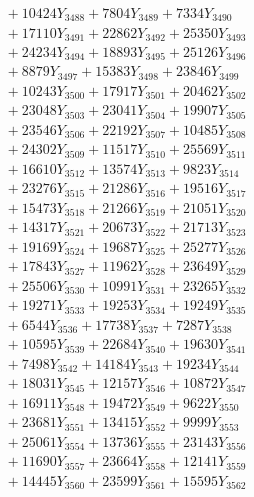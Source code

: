 \documentclass[a4paper,10pt]{article}
\begin{document}
{\begin{align}
&\;  + 10424 Y_{3488} + 7804 Y_{3489} + 7334 Y_{3490} \\[0.3ex]
&\;  + 17110 Y_{3491} + 22862 Y_{3492} + 25350 Y_{3493} \\[0.3ex]
&\;  + 24234 Y_{3494} + 18893 Y_{3495} + 25126 Y_{3496} \\[0.3ex]
&\;  + 8879 Y_{3497} + 15383 Y_{3498} + 23846 Y_{3499} \\[0.3ex]
&\;  + 10243 Y_{3500} + 17917 Y_{3501} + 20462 Y_{3502} \\[0.3ex]
&\;  + 23048 Y_{3503} + 23041 Y_{3504} + 19907 Y_{3505} \\[0.3ex]
&\;  + 23546 Y_{3506} + 22192 Y_{3507} + 10485 Y_{3508} \\[0.5ex]\allowbreak
&\;  + 24302 Y_{3509} + 11517 Y_{3510} + 25569 Y_{3511} \\[0.3ex]
&\;  + 16610 Y_{3512} + 13574 Y_{3513} + 9823 Y_{3514} \\[0.3ex]
&\;  + 23276 Y_{3515} + 21286 Y_{3516} + 19516 Y_{3517} \\[0.3ex]
&\;  + 15473 Y_{3518} + 21266 Y_{3519} + 21051 Y_{3520} \\[0.3ex]
&\;  + 14317 Y_{3521} + 20673 Y_{3522} + 21713 Y_{3523} \\[0.3ex]
&\;  + 19169 Y_{3524} + 19687 Y_{3525} + 25277 Y_{3526} \\[0.3ex]
&\;  + 17843 Y_{3527} + 11962 Y_{3528} + 23649 Y_{3529} \\[0.3ex]
&\;  + 25506 Y_{3530} + 10991 Y_{3531} + 23265 Y_{3532} \\[0.3ex]
&\;  + 19271 Y_{3533} + 19253 Y_{3534} + 19249 Y_{3535} \\[0.3ex]
&\;  + 6544 Y_{3536} + 17738 Y_{3537} + 7287 Y_{3538} \\[0.5ex]\allowbreak
&\;  + 10595 Y_{3539} + 22684 Y_{3540} + 19630 Y_{3541} \\[0.3ex]
&\;  + 7498 Y_{3542} + 14184 Y_{3543} + 19234 Y_{3544} \\[0.3ex]
&\;  + 18031 Y_{3545} + 12157 Y_{3546} + 10872 Y_{3547} \\[0.3ex]
&\;  + 16911 Y_{3548} + 19472 Y_{3549} + 9622 Y_{3550} \\[0.3ex]
&\;  + 23681 Y_{3551} + 13415 Y_{3552} + 9999 Y_{3553} \\[0.3ex]
&\;  + 25061 Y_{3554} + 13736 Y_{3555} + 23143 Y_{3556} \\[0.3ex]
&\;  + 11690 Y_{3557} + 23664 Y_{3558} + 12141 Y_{3559} \\[0.3ex]
&\;  + 14445 Y_{3560} + 23599 Y_{3561} + 15595 Y_{3562} \\[0.3ex]

\end{align}}
\end{document}
